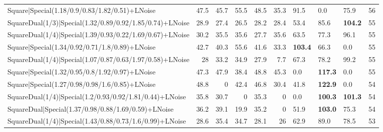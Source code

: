 \begin{tabular}{lrrrrrlllr}
 Square|Special(1.18/0.9/0.83/1.82/0.51)+LNoise                  &            47.5 &            45.7 &            55.5 &            48.5 &           35.3 & 91.5            & 0.0            & 75.9           &           56 \\
 SquareDual(1/3)|Special(1.32/0.89/0.92/1.85/0.74)+LNoise        &            28.9 &            27.4 &            26.5 &            28.2 &           28.4 & 53.4            & 85.6           & \textbf{104.2} &           55 \\
 SquareDual(1/4)|Special(1.39/0.93/0.22/1.69/0.67)+LNoise        &            30.2 &            35.5 &            35.6 &            27.7 &           35.6 & 63.5            & 77.3           & 96.1           &           55 \\
 Square|Special(1.34/0.92/0.71/1.8/0.89)+LNoise                  &            42.7 &            40.3 &            55.6 &            41.6 &           33.3 & \textbf{103.4}  & 66.3           & 0.0            &           55 \\
 SquareDual(1/4)|Special(1.07/0.87/0.63/1.97/0.58)+LNoise        &            28   &            33.2 &            34.9 &            27.9 &            7.7 & 67.3            & 78.2           & 99.2           &           55 \\
 Square|Special(1.32/0.95/0.8/1.92/0.97)+LNoise                  &            47.3 &            47.9 &            38.4 &            48.8 &           45.3 & 0.0             & \textbf{117.3} & 0.0            &           55 \\
 Square|Special(1.27/0.98/0.98/1.6/0.85)+LNoise                  &            48.8 &             0   &            42.4 &            46.8 &           30.4 & 41.8            & \textbf{122.9} & 0.0            &           54 \\
 SquareDual(1/4)|Special(1.2/0.93/0.92/1.81/0.44)+LNoise         &            35.8 &            30.7 &             0   &            35.3 &            0   & 0.0             & \textbf{100.3} & \textbf{101.3} &           54 \\
 SquareDual|Special(1.37/0.98/0.88/1.69/0.59)+LNoise             &            36.2 &            39.1 &            19.9 &            35.2 &            0   & 51.9            & \textbf{103.0} & 75.3           &           54 \\
 SquareDual(1/4)|Special(1.43/0.88/0.73/1.6/0.99)+LNoise         &            28.6 &            35.4 &            34.7 &            28.1 &           26   & 62.9            & 89.0           & 78.5           &           53 \\

\end{tabular}
